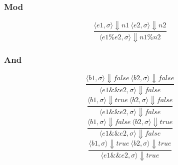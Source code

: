 \documentclass[12pt]{article}
\begin{document}
                \subsubsection{Mod}
                    \begin{equation}  
                        \frac{\langle e1, \sigma \rangle\Downarrow n1 \: \langle e2, \sigma \rangle\Downarrow n2}
                        {\langle e1 \% e2, \sigma \rangle\Downarrow n1 \% n2}
                    \end{equation}
                    
                \subsubsection{And}
                    \begin{equation}  
                        \frac{\langle b1, \sigma \rangle\Downarrow false \: \langle b2, \sigma \rangle\Downarrow false}
                        {\langle e1 \&\& e2, \sigma \rangle\Downarrow false}
                    \end{equation}
                    \begin{equation}  
                        \frac{\langle b1, \sigma \rangle\Downarrow true \: \langle b2, \sigma \rangle\Downarrow false}
                        {\langle e1 \&\& e2, \sigma \rangle\Downarrow false}
                    \end{equation}
                    \begin{equation}  
                        \frac{\langle b1, \sigma \rangle\Downarrow false \: \langle b2, \sigma \rangle\Downarrow true}
                        {\langle e1 \&\& e2, \sigma \rangle\Downarrow false}
                    \end{equation}
                    \begin{equation}  
                        \frac{\langle b1, \sigma \rangle\Downarrow true \: \langle b2, \sigma \rangle\Downarrow true}
                        {\langle e1 \&\& e2, \sigma \rangle\Downarrow true}
                    \end{equation}
                    
\end{document}
